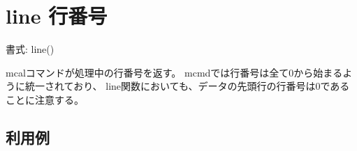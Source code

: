 
%

\section{line 行番号\label{sect:line}}

書式: line()

mcalコマンドが処理中の行番号を返す。
mcmdでは行番号は全て0から始まるように統一されており、
line関数においても、データの先頭行の行番号は0であることに注意する。

\subsection*{利用例}


%

